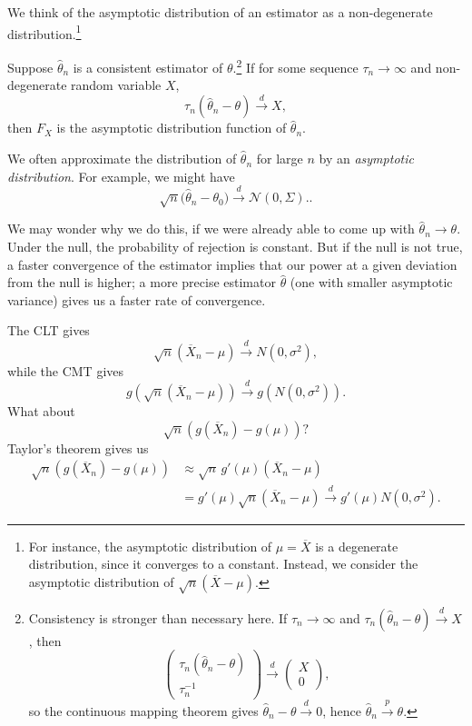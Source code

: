 \begin{definition}
	We think of the asymptotic distribution of an estimator as a non-degenerate distribution.\footnote{For instance, the asymptotic distribution of $\hat{\mu} = \overline{X}$ is a degenerate distribution, since it converges to a constant. Instead, we consider the asymptotic distribution of $\sqrt{n} \left( \overline{X} - \mu \right)$.}

	Suppose $\hat{\theta}_n$ is a consistent estimator of $\theta$.\footnote{Consistency is stronger than necessary here. If $\tau_n \to \infty$ and $\tau_n (\hat{\theta}_n-\theta)\xrightarrow{d} X$, then
	\[
		\begin{pmatrix}
			\tau_n (\hat{\theta}_n-\theta) \\
			\tau_n^{-1}
		\end{pmatrix} \xrightarrow{d} \begin{pmatrix}
			X \\
			0
		\end{pmatrix},
	\]
	so the continuous mapping theorem gives $\hat{\theta}_n-\theta \xrightarrow{d} 0$, hence $\hat{\theta}_n \xrightarrow{p} \theta$.} If for some sequence $\tau_n \to \infty$ and non-degenerate random variable $X$, \[
		\tau_n \left( \hat{\theta}_n - \theta \right) \xrightarrow{d} X
	,\] then $F_X$ is the asymptotic distribution function of $\hat{\theta}_n$.

	We often approximate the distribution of $\hat\theta_n$ for large $n$ by an \emph{asymptotic distribution}. For example, we might have
	\[
		\sqrt{n}\big(\hat\theta_n-\theta_0\big)\xrightarrow{d}\mathcal{N}(0,\Sigma).
	.\]

	We may wonder why we do this, if we were already able to come up with $\hat{\theta}_n \to \theta$. Under the null, the probability of rejection is constant. But if the null is not true, a faster convergence of the estimator implies that our power at a given deviation from the null is higher; a more precise estimator $\hat{\theta}$ (one with smaller asymptotic variance) gives us a faster rate of convergence.
\end{definition}

The CLT gives \[
	\sqrt{n} \left( \overline{X}_n - \mu \right)\xrightarrow{d}N(0,\sigma^2)
,\] while the CMT gives \[
	g\left( \sqrt{n} \left( \overline{X}_n - \mu \right) \right)\xrightarrow{d} g\left( N(0,\sigma^2) \right)
.\] What about \[
	\sqrt{n} \left( g(\overline{X}_n) - g(\mu) \right)
?\] 
Taylor's theorem gives us
\begin{align*}
	\sqrt{n} \left( g(\overline{X}_n) - g(\mu) \right)
	&\approx \sqrt{n}\, g'(\mu)\left( \overline{X}_n - \mu \right) \\
	&= g'(\mu)\sqrt{n}\left( \overline{X}_n - \mu \right)
	\xrightarrow{d} g'(\mu)N(0,\sigma^2)
.\end{align*}

